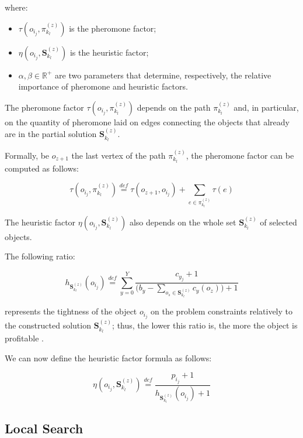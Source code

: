 \documentclass[12pt,a4paper]{report}
\newcommand{\mathDef}{\overset{\textit{def}}{=}}
\newcommand{\Rplus}{\mathbb{R}^+}
\begin{document}
where:

\begin{itemize}
	\item $\tau( o_{i_j}, \pi_{k_l}^{(z)})$ is the pheromone factor;
	\item $\eta( o_{i_j}, \textbf{S}_{k_l}^{(z)})$ is the heuristic factor;
	\item $\alpha, \beta \in \Rplus$ are two parameters that determine, respectively, the relative importance of pheromone and heuristic factors.
\end{itemize}

The pheromone factor $\tau( o_{i_j}, \pi_{k_l}^{(z)})$ depends on the path $\pi_{k_l}^{(z)}$ and, in particular, on the quantity of pheromone laid on edges connecting the objects that already are in the partial solution $\textbf{S}_{k_l}^{(z)}$.

Formally, be $o_{z+1}$ the last vertex of the path $\pi_{k_l}^{(z)}$, the pheromone factor can be computed as follows:

\begin{equation}
	\tau( o_{i_j}, \pi_{k_l}^{(z)}) \mathDef \tau(o_{z+1}, o_{i_j}) + \sum_{e \in \pi_{k_l}^{(z)}} \tau(e) 
\end{equation}

The heuristic factor $\eta( o_{i_j}, \textbf{S}_{k_l}^{(z)})$ also depends on the whole set $\textbf{S}_{k_l}^{(z)}$ of selected objects. 

The following ratio:

\begin{equation}
	h_{\textbf{S}_{k_l}^{(z)}}(o_{i_j}) \mathDef \displaystyle \sum_{y=0}^{Y} \frac{c_{y_j} + 1}{\displaystyle  \Big( b_y - \sum_{o_s \in \textbf{S}_{k_l}^{(z)}} c_y(o_z)\Big) + 1}
\end{equation}

represents the tightness of the object $o_{i_j}$ on the problem constraints relatively to the constructed solution $\textbf{S}_{k_l}^{(z)}$; thus, the lower this ratio is, the more the object is profitable \cite{acosemplice}.

We can now define the heuristic factor formula as follows:

\begin{equation}
	\eta( o_{i_j}, \textbf{S}_{k_l}^{(z)}) \mathDef \frac{p_{i_j} + 1}{h_{\textbf{S}_{k_l}^{(z)}}(o_{i_j}) + 1}
\end{equation}

\subsection{Local Search}
\end{document}
